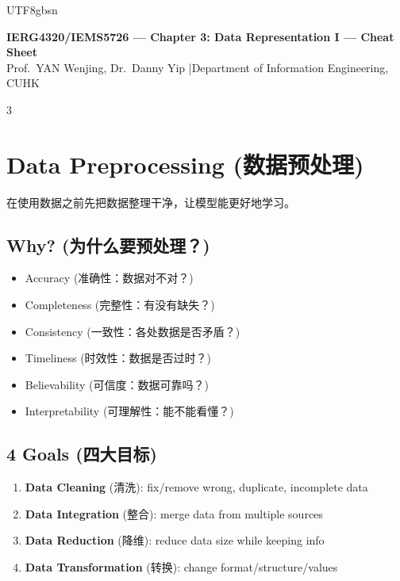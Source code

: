 \documentclass[10pt,landscape,a4paper]{article}
\newcommand{\zhint}[1]{{\scriptsize\color{gray!70!black}#1}}
\begin{document}
\begin{CJK}{UTF8}{gbsn}

\begin{center}
    {\large\bfseries IERG4320/IEMS5726 --- Chapter 3: Data Representation I --- Cheat Sheet}\\[2pt]
    {\small Prof.\ YAN Wenjing, Dr.\ Danny Yip \quad|\quad Department of Information Engineering, CUHK}
\end{center}

\vspace{2pt}
\begin{multicols}{3}

\section{Data Preprocessing \zhint{(数据预处理)}}

\zhint{在使用数据之前先把数据整理干净，让模型能更好地学习。}

\subsection{Why? \zhint{(为什么要预处理？)}}
\begin{itemize}[leftmargin=*, nosep, itemsep=0pt]
    \item Accuracy \zhint{(准确性：数据对不对？)}
    \item Completeness \zhint{(完整性：有没有缺失？)}
    \item Consistency \zhint{(一致性：各处数据是否矛盾？)}
    \item Timeliness \zhint{(时效性：数据是否过时？)}
    \item Believability \zhint{(可信度：数据可靠吗？)}
    \item Interpretability \zhint{(可理解性：能不能看懂？)}
\end{itemize}

\subsection{4 Goals \zhint{(四大目标)}}
\begin{enumerate}[leftmargin=*, nosep, itemsep=0pt]
    \item \textbf{Data Cleaning} \zhint{(清洗)}: fix/remove wrong, duplicate, incomplete data
    \item \textbf{Data Integration} \zhint{(整合)}: merge data from multiple sources
    \item \textbf{Data Reduction} \zhint{(降维)}: reduce data size while keeping info
    \item \textbf{Data Transformation} \zhint{(转换)}: change format/structure/values
\end{enumerate}


\end{multicols}
\end{CJK}
\end{document}
